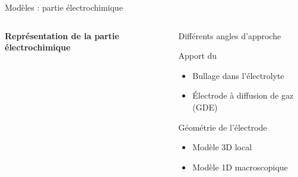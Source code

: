 
\begin{frame}[t]{Modèles : partie électrochimique}
  \vspace{-1em}

  \begin{columns}[T,onlytextwidth]

      \begin{pccard}
        \centering
        \figschemaelectrochimique
        \vspace{0.5em}
        {\scriptsize\bfseries\color{pcNavy}
        Représentation de la partie électrochimique}
      \end{pccard}

      \vspace{-0.5em}
      \begin{pcbanner}{Différents angles d'approche}


        \begin{pcbannerlight}{Apport du }
          \vspace{0.3em}
          \begin{itemize}\footnotesize
                \item Bullage dans l'électrolyte 
                \item Électrode à diffusion de gaz (GDE)
          \end{itemize}
        \end{pcbannerlight}

        \vspace{-0.5em}

        \begin{pcbannerlight}{Géométrie de l'électrode}
          \vspace{0.3em}
          \begin{itemize}\footnotesize
            \item Modèle 3D local 
            \item Modèle 1D macroscopique
          \end{itemize}
        \end{pcbannerlight}

      \end{pcbanner}
    \end{columns}



\end{frame}
